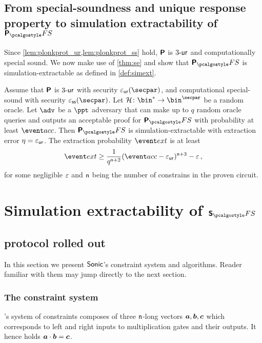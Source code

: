 \documentclass[runningheads,11pt]{llncs}
\theoremstyle{definition} \newtheorem{definition}[theorem]{Definition}
\begin{document}
\subsection{From special-soundness and unique response property to simulation
  extractability of $\plonkprotfs$}

Since \cref{lem:plonkprot_ur,lem:plonkprot_ss} hold, $\bm{\mathsf{P}}$ is ${3\text{-}\mathsf{ur}}$
and computationally special sound. We now 
make use of \cref{thm:se} and show that
$\plonkprot_\fs$ is simulation-extractable as defined in \cref{def:simext}.

\begin{corollary}
\label{thm:plonkprotfs_se}
Assume that $\bm{\mathsf{P}}$ is ${3\text{-}\mathsf{ur}}$ with security $\epsur(\secpar)$, and
computational special-sound with security $\epsss(\secpar)$. Let $\ro\colon
\bin^* \to \bin^\secpar$ be a random oracle. Let $\advse$ be a $\ppt$ adversary
that can make up to $q$ random oracle queries and outputs an acceptable proof
for $\plonkprotfs$ with probability at least $\accProb$. Then $\plonkprotfs$ is
simulation-extractable with extraction error $\eta = \varepsilon_{\mathsf{ur}}$. The extraction
probability $\extProb$ is at least
\[
	\extProb \geq \frac{1}{q^{\noofc + 2}} (\accProb - \epsur)^{\noofc + 3} -\eps\,,
\]
for some negligible $\varepsilon$ and $\mathsf{n}$ being the number of
constrains in the proven circuit.
\end{corollary}

\section{Simulation extractability of $\sonicprotfs$}
\label{sec:sonic}
\subsection{\sonic{} protocol rolled out}
In this section we present ${\textnormal{\textsf{Sonic}}}$'s constraint system and algorithms. Reader
familiar with them may jump directly to the next section.

\subsubsection{The constraint system}
\label{sec:sonic_constraint_system}
\sonic's system of constraints composes of three $\mathsf{n}$-long vectors
$\va, \vb, \vc$ which corresponds to left and right inputs to multiplication
gates and their outputs. It hence holds $\va \cdot \vb = \vc$.
\end{document}
